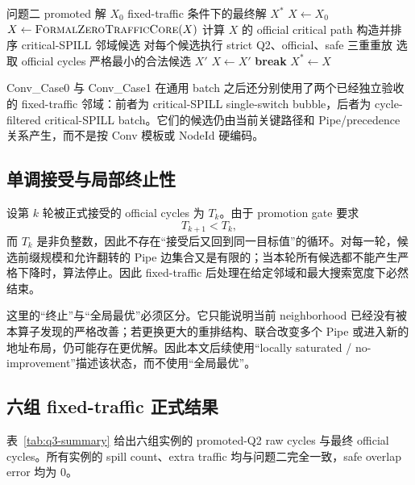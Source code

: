 \begin{algorithm}[H]
\caption{问题三 fixed-traffic 单调优化框架}
\label{alg:q3-fixed-traffic}
\begin{algorithmic}[1]
\Require 问题二 promoted 解 $X_0$
\Ensure fixed-traffic 条件下的最终解 $X^*$
\State $X\gets X_0$
\State $X\gets\textsc{FormalZeroTrafficCore}(X)$
\Repeat
    \State 计算 $X$ 的 official critical path
    \State 构造并排序 critical-SPILL 邻域候选
    \State 对每个候选执行 strict Q2、official、safe 三重重放
    \State 选取 official cycles 严格最小的合法候选 $X'$ 
        \State $X\gets X'$
    \Else
        \State \textbf{break}
    \EndIf
{}
\State \Return $X^*\gets X$
\end{algorithmic}
\end{algorithm}

Conv\_Case0 与 Conv\_Case1 在通用 batch 之后还分别使用了两个已经独立验收的 fixed-traffic 邻域：前者为 critical-SPILL single-switch bubble，后者为 cycle-filtered critical-SPILL batch。它们的候选仍由当前关键路径和 Pipe/precedence 关系产生，而不是按 Conv 模板或 NodeId 硬编码。

\subsection{单调接受与局部终止性}

设第 $k$ 轮被正式接受的 official cycles 为 $T_k$。由于 promotion gate 要求
\[
T_{k+1}<T_k,
\]
而 $T_k$ 是非负整数，因此不存在“接受后又回到同一目标值”的循环。对每一轮，候选前缀规模和允许翻转的 Pipe 边集合又是有限的；当本轮所有候选都不能产生严格下降时，算法停止。因此 fixed-traffic 后处理在给定邻域和最大搜索宽度下必然结束。

这里的“终止”与“全局最优”必须区分。它只能说明当前 neighborhood 已经没有被本算子发现的严格改善；若更换更大的重排结构、联合改变多个 Pipe 或进入新的地址布局，仍可能存在更优解。因此本文后续使用“locally saturated / no-improvement”描述该状态，而不使用“全局最优”。

\subsection{六组 fixed-traffic 正式结果}

表~\ref{tab:q3-summary} 给出六组实例的 promoted-Q2 raw cycles 与最终 official cycles。所有实例的 spill count、extra traffic 均与问题二完全一致，safe overlap error 均为 0。

\begin{table}[H]
    \centering
    \caption{问题三六组实例的 fixed-traffic 正式结果}
    \label{tab:q3-summary}
    \resizebox{0.95\textwidth}{!}{}
\end{table}

